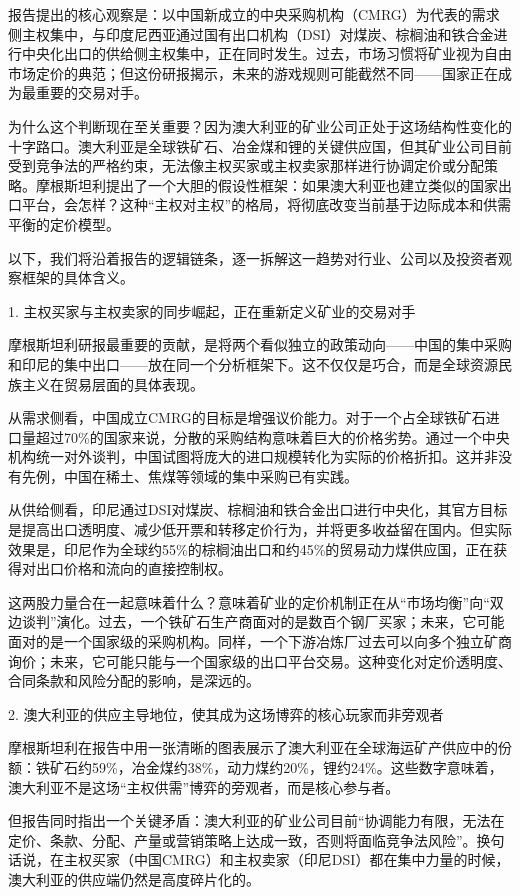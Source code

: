 \documentclass[11pt]{ctexart}
\begin{document}
报告提出的核心观察是：以中国新成立的中央采购机构（CMRG）为代表的需求侧主权集中，与印度尼西亚通过国有出口机构（DSI）对煤炭、棕榈油和铁合金进行中央化出口的供给侧主权集中，正在同时发生。过去，市场习惯将矿业视为自由市场定价的典范；但这份研报揭示，未来的游戏规则可能截然不同——国家正在成为最重要的交易对手。

为什么这个判断现在至关重要？因为澳大利亚的矿业公司正处于这场结构性变化的十字路口。澳大利亚是全球铁矿石、冶金煤和锂的关键供应国，但其矿业公司目前受到竞争法的严格约束，无法像主权买家或主权卖家那样进行协调定价或分配策略。摩根斯坦利提出了一个大胆的假设性框架：如果澳大利亚也建立类似的国家出口平台，会怎样？这种“主权对主权”的格局，将彻底改变当前基于边际成本和供需平衡的定价模型。

以下，我们将沿着报告的逻辑链条，逐一拆解这一趋势对行业、公司以及投资者观察框架的具体含义。

1. 主权买家与主权卖家的同步崛起，正在重新定义矿业的交易对手

摩根斯坦利研报最重要的贡献，是将两个看似独立的政策动向——中国的集中采购和印尼的集中出口——放在同一个分析框架下。这不仅仅是巧合，而是全球资源民族主义在贸易层面的具体表现。

从需求侧看，中国成立CMRG的目标是增强议价能力。对于一个占全球铁矿石进口量超过70\%的国家来说，分散的采购结构意味着巨大的价格劣势。通过一个中央机构统一对外谈判，中国试图将庞大的进口规模转化为实际的价格折扣。这并非没有先例，中国在稀土、焦煤等领域的集中采购已有实践。

从供给侧看，印尼通过DSI对煤炭、棕榈油和铁合金出口进行中央化，其官方目标是提高出口透明度、减少低开票和转移定价行为，并将更多收益留在国内。但实际效果是，印尼作为全球约55\%的棕榈油出口和约45\%的贸易动力煤供应国，正在获得对出口价格和流向的直接控制权。

这两股力量合在一起意味着什么？意味着矿业的定价机制正在从“市场均衡”向“双边谈判”演化。过去，一个铁矿石生产商面对的是数百个钢厂买家；未来，它可能面对的是一个国家级的采购机构。同样，一个下游冶炼厂过去可以向多个独立矿商询价；未来，它可能只能与一个国家级的出口平台交易。这种变化对定价透明度、合同条款和风险分配的影响，是深远的。

2. 澳大利亚的供应主导地位，使其成为这场博弈的核心玩家而非旁观者

摩根斯坦利在报告中用一张清晰的图表展示了澳大利亚在全球海运矿产供应中的份额：铁矿石约59\%，冶金煤约38\%，动力煤约20\%，锂约24\%。这些数字意味着，澳大利亚不是这场“主权供需”博弈的旁观者，而是核心参与者。

但报告同时指出一个关键矛盾：澳大利亚的矿业公司目前“协调能力有限，无法在定价、条款、分配、产量或营销策略上达成一致，否则将面临竞争法风险”。换句话说，在主权买家（中国CMRG）和主权卖家（印尼DSI）都在集中力量的时候，澳大利亚的供应端仍然是高度碎片化的。
\end{document}
